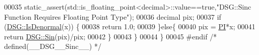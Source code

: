 \begin{DoxyCode}
00035         static\_assert(std::is\_floating\_point<decimal>::value==\textcolor{keyword}{true},\textcolor{stringliteral}{"DSG::Sinc Function Requires Floating
       Point Type"});
00036         decimal pix;
00037         \textcolor{keywordflow}{if} (\hyperlink{namespace_d_s_g_a9eee3c39a1f45d42f0b4fa7201d3ba3d}{DSG::IsDenormal}(x)) \{
00038             \textcolor{keywordflow}{return} 1.0;
00039         \}\textcolor{keywordflow}{else}\{
00040             pix = \hyperlink{_p_i_8h_a598a3330b3c21701223ee0ca14316eca}{PI}*x;
00041             \textcolor{keywordflow}{return} \hyperlink{namespace_d_s_g_aad63d316081c7d13a551acf346ee2749}{DSG::Sin}(pix)/pix;
00042         \}
00043     \}
00044 \}
00045 \textcolor{preprocessor}{#endif }\textcolor{comment}{/* defined(\_\_DSG\_\_Sinc\_\_) */}\textcolor{preprocessor}{}
\end{DoxyCode}
